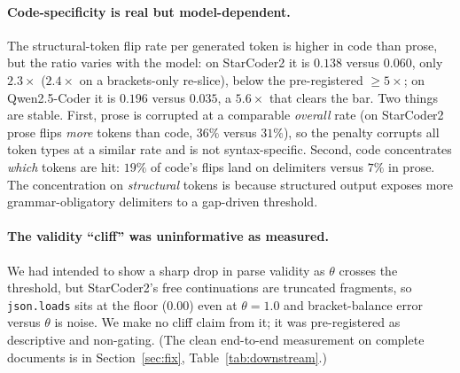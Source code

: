 \documentclass[11pt]{article}
\newcommand{\thp}{\theta}
\newcommand{\code}[1]{\texttt{#1}}
\begin{document}
\paragraph{Code-specificity is real but model-dependent.} The structural-token flip rate per
generated token is higher in code than prose, but the ratio varies with the model: on StarCoder2
it is $0.138$ versus $0.060$, only $2.3\times$ ($2.4\times$ on a brackets-only re-slice), below
the pre-registered $\ge 5\times$; on Qwen2.5-Coder it is $0.196$ versus $0.035$, a $5.6\times$
that clears the bar. Two things are stable. First, prose is corrupted at a comparable
\emph{overall} rate (on StarCoder2 prose flips \emph{more} tokens than code, $36\%$
versus $31\%$), so the penalty corrupts all token types at a similar rate and is not syntax-specific.
Second, code concentrates \emph{which} tokens are hit: $19\%$ of code's flips land on delimiters
versus $7\%$ in prose. The concentration on \emph{structural} tokens is because structured output
exposes more grammar-obligatory delimiters to a gap-driven threshold.

\paragraph{The validity ``cliff'' was uninformative as measured.} We had intended to show a sharp
drop in parse validity as $\thp$ crosses the threshold, but StarCoder2's free continuations are
truncated fragments, so \code{json.loads} sits at the floor ($0.00$) even at $\thp=1.0$ and
bracket-balance error versus $\thp$ is noise. We make no cliff claim from it; it was
pre-registered as descriptive and non-gating. (The clean end-to-end measurement on complete
documents is in Section~\ref{sec:fix}, Table~\ref{tab:downstream}.)



\end{document}
